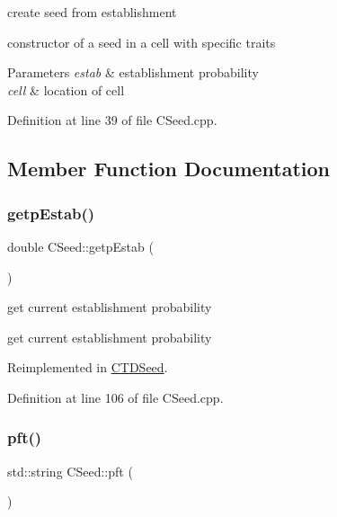 create seed from establishment 

constructor of a seed in a cell with specific traits 
\begin{DoxyParams}{Parameters}
{\em estab} & establishment probability \\
\hline
{\em cell} & location of cell \\
\hline
\end{DoxyParams}


Definition at line 39 of file C\+Seed.\+cpp.



\subsection{Member Function Documentation}
\mbox{\label{class_c_seed_a6845f39091b1c9d8c31a9ee87ca8f8f0}} 
\subsubsection{\texorpdfstring{getpEstab()}{getpEstab()}}
{\footnotesize\ttfamily double C\+Seed\+::getp\+Estab (\begin{DoxyParamCaption}{ }\end{DoxyParamCaption})\hspace{0.3cm}{\ttfamily [virtual]}}



get current establishment probability 

get current establishment probability 

Reimplemented in \mbox{\hyperlink{class_c_t_d_seed_a0e62cd8894a79f484cdacfb026839609}{C\+T\+D\+Seed}}.



Definition at line 106 of file C\+Seed.\+cpp.

\mbox{\label{class_c_seed_a6e0601a2fd06a652e34e57916dbdacb9}} 
\subsubsection{\texorpdfstring{pft()}{pft()}}
{\footnotesize\ttfamily std\+::string C\+Seed\+::pft (\begin{DoxyParamCaption}{ }\end{DoxyParamCaption})\hspace{0.3cm}{\ttfamily [virtual]}}



